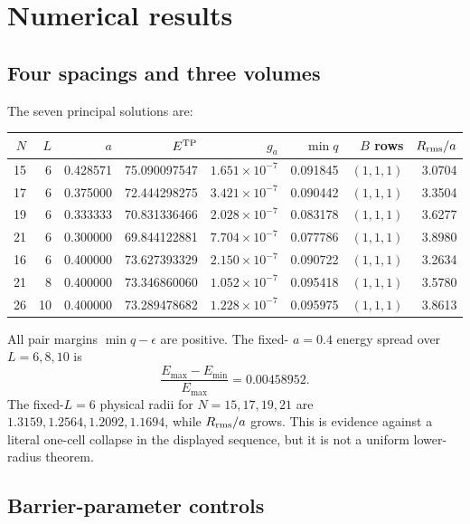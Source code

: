 \documentclass[11pt]{article}
\numberwithin{equation}{section}
\theoremstyle{definition}
\theoremstyle{remark}
\begin{document}
\section{Numerical results}

\subsection{Four spacings and three volumes}

The seven principal solutions are:
\begin{center}
\small
\begin{tabular}{rrrrrrrr}
\toprule
\(N\)&\(L\)&\(a\)&\(E^{\rm TP}\)&\(g_a\)&\(\min q\)&\(B\) rows&\(R_{\rm rms}/a\)\\
\midrule
15&6&0.428571&75.090097547&\(1.651\!\times10^{-7}\)&0.091845&\((1,1,1)\)&3.0704\\
17&6&0.375000&72.444298275&\(3.421\!\times10^{-7}\)&0.090442&\((1,1,1)\)&3.3504\\
19&6&0.333333&70.831336466&\(2.028\!\times10^{-7}\)&0.083178&\((1,1,1)\)&3.6277\\
21&6&0.300000&69.844122881&\(7.704\!\times10^{-7}\)&0.077786&\((1,1,1)\)&3.8980\\
16&6&0.400000&73.627393329&\(2.150\!\times10^{-7}\)&0.090722&\((1,1,1)\)&3.2634\\
21&8&0.400000&73.346860060&\(1.052\!\times10^{-7}\)&0.095418&\((1,1,1)\)&3.5780\\
26&10&0.400000&73.289478682&\(1.228\!\times10^{-7}\)&0.095975&\((1,1,1)\)&3.8613\\
\bottomrule
\end{tabular}
\end{center}
All pair margins \(\min q-\epsilon\) are positive.  The fixed-
\(a=0.4\) energy spread over \(L=6,8,10\) is
\begin{equation}
 \frac{E_{\max}-E_{\min}}{E_{\max}}=0.00458952.
 \label{eq:volume-spread}
\end{equation}
The fixed-\(L=6\) physical radii for \(N=15,17,19,21\) are
\(1.3159,1.2564,1.2092,1.1694\), while \(R_{\rm rms}/a\) grows.  This is evidence
against a literal one-cell collapse in the displayed sequence, but it is not
a uniform lower-radius theorem.

\subsection{Barrier-parameter controls}
\end{document}
